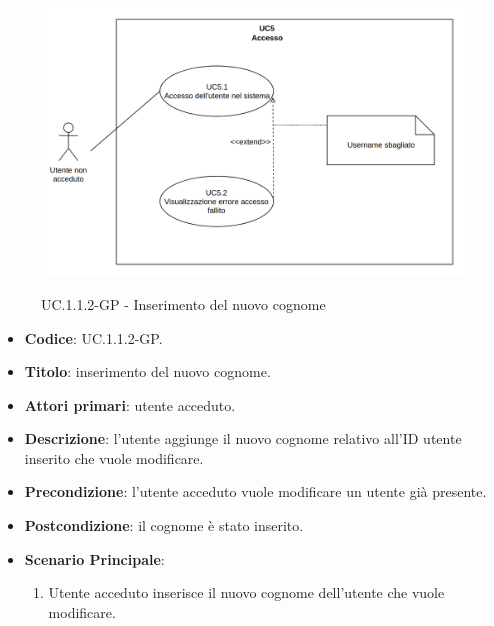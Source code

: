 				\begin{figure}[H]
					\centering
					\includegraphics[width=\columnwidth]{img/UC5.png}\\
					\caption{UC\theuccount.1.1.2-GP - Inserimento del nuovo cognome}
				\end{figure}
				\begin{itemize}
					\item \textbf{Codice}: UC\theuccount.1.1.2-GP.
					\item \textbf{Titolo}: inserimento del nuovo cognome.
					\item \textbf{Attori primari}: utente acceduto.
					\item \textbf{Descrizione}: l'utente aggiunge il nuovo cognome relativo all'ID utente inserito che vuole modificare.
					\item \textbf{Precondizione}: l'utente acceduto vuole modificare un utente già presente.
					\item \textbf{Postcondizione}: il cognome è stato inserito.
					\item \textbf{Scenario Principale}:
					\begin{enumerate}
						\item Utente acceduto inserisce il nuovo cognome dell'utente che vuole modificare.
					\end{enumerate}
				\end{itemize}
			
